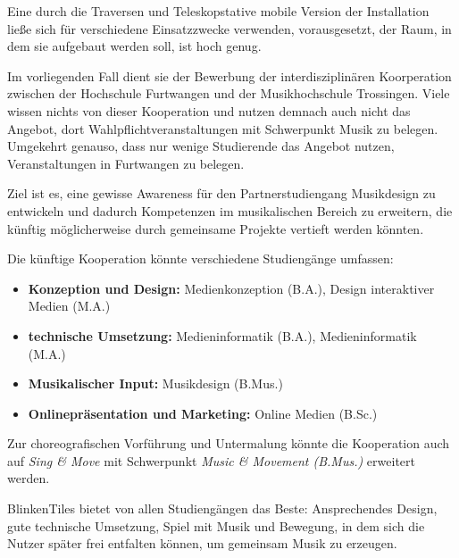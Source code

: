 \clearpage


Eine durch die Traversen und Teleskopstative mobile Version der Installation ließe sich für verschiedene Einsatzzwecke verwenden, vorausgesetzt, der Raum, in dem sie aufgebaut werden soll, ist hoch genug.

Im vorliegenden Fall dient sie der Bewerbung der interdisziplinären Koorperation zwischen der Hochschule Furtwangen und der Musikhochschule Trossingen. Viele wissen nichts von dieser Kooperation und nutzen demnach auch nicht das Angebot, dort Wahlpflichtveranstaltungen mit Schwerpunkt Musik zu belegen. Umgekehrt genauso, dass nur wenige Studierende das Angebot nutzen, Veranstaltungen in Furtwangen zu belegen.

Ziel ist es, eine gewisse Awareness für den Partnerstudiengang Musikdesign zu entwickeln und dadurch Kompetenzen im musikalischen Bereich zu erweitern, die künftig möglicherweise durch gemeinsame Projekte vertieft werden könnten.

Die künftige Kooperation könnte verschiedene Studiengänge umfassen:

\vspace{0.5em}

\begin{itemize}
	\item \textbf{Konzeption und Design:} Medienkonzeption (B.A.), Design interaktiver Medien (M.A.)
	\item \textbf{technische Umsetzung:} Medieninformatik (B.A.), Medieninformatik (M.A.)
	\item \textbf{Musikalischer Input:} Musikdesign (B.Mus.)
	\item \textbf{Onlinepräsentation und Marketing:} Online Medien (B.Sc.)
\end{itemize}

\vspace{0.5em}

Zur choreografischen Vorführung und Untermalung könnte die Kooperation auch auf \emph{Sing \& Move} mit Schwerpunkt \emph{Music \& Movement (B.Mus.)} erweitert werden.

BlinkenTiles bietet von allen Studiengängen das Beste: Ansprechendes Design, gute technische Umsetzung, Spiel mit Musik und Bewegung, in dem sich die Nutzer später frei entfalten können, um gemeinsam Musik zu erzeugen.

\clearpage






